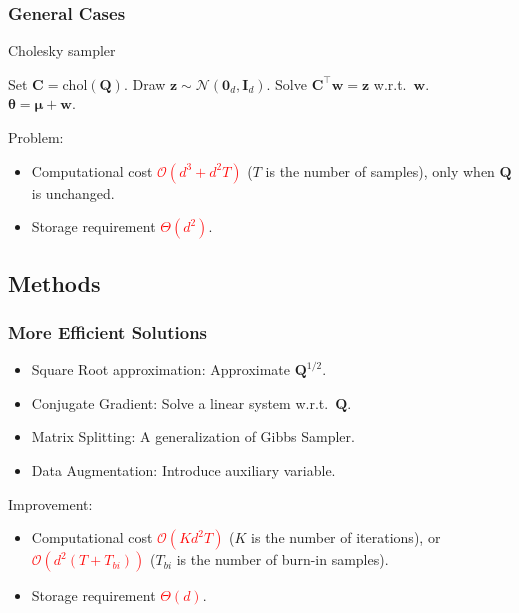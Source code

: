 \documentclass[aspectratio=169]{beamer}
\newcommand{\B}[1]{\mathbf{#1}} %
\newcommand{\Bs}[1]{\boldsymbol{#1}} %
\begin{document}
\begin{frame}
\frametitle{General Cases}
\begin{algorithm}[H]
\caption{Cholesky sampler}
\begin{algorithmic}[1]
\State Set $\B{C} = \text{chol}(\B{Q})$.
\Comment{\textcolor{blue}{$\B{Q} = \B{C}\B{C}^{\top}$}}
\State Draw $\B{z} \sim \mathcal{N}(\B{0}_d,\B{I}_d)$.
\State Solve $\B{C}^{\top}\B{w} = \B{z}$ w.r.t.\ $\B{w}$.\\
\Return $\Bs{\theta} = \Bs{\mu} + \B{w}$.
\end{algorithmic}
\end{algorithm}
Problem: 
\begin{itemize}
\item Computational cost \textcolor{red}{\(\mathcal{O}(d^3 + d^2T)\)} (\(T\) is the number of samples), only when \(\B{Q}\) is unchanged.
\item Storage requirement \textcolor{red}{\(\Theta(d^2)\)}.
\end{itemize}
\end{frame}

\subsection{Methods}
\begin{frame}
\frametitle{More Efficient Solutions}
\begin{itemize}
    \item Square Root approximation: Approximate \(\B{Q}^{1/2}\).
    \item Conjugate Gradient: Solve a linear system w.r.t.\ \(\B{Q}\).
    \item Matrix Splitting: A generalization of Gibbs Sampler.
    \item Data Augmentation: Introduce auxiliary variable.
\end{itemize}
Improvement: 
\begin{itemize}
\item Computational cost \textcolor{red}{$\mathcal{O}(Kd^2T)$} (\(K\) is the number of iterations), or \textcolor{red}{$\mathcal{O}(d^2(T+T_{bi}))$} (\(T_{bi}\) is the number of burn-in samples).
\item Storage requirement \textcolor{red}{\(\Theta(d)\)}.
\end{itemize}
\end{frame}
\end{document}
